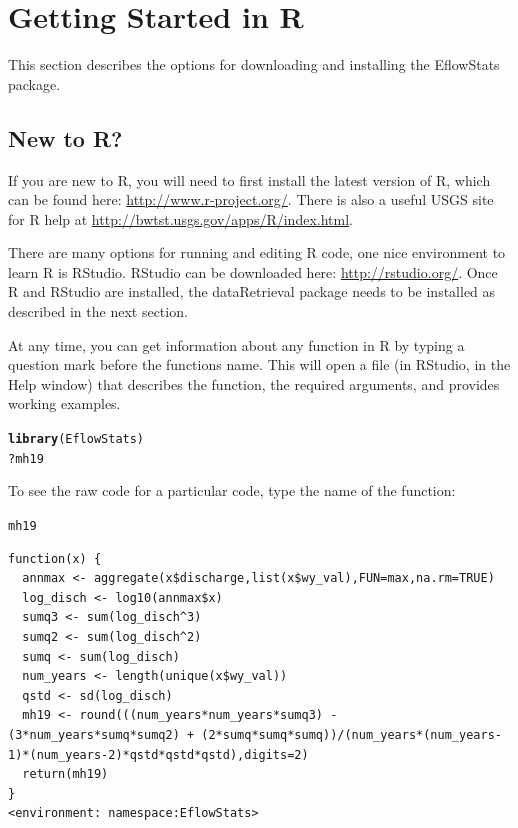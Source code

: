 \documentclass[a4paper,11pt]{article}\usepackage[]{graphicx}\usepackage[]{color}
\makeatletter
\newcommand{\hlopt}[1]{\textcolor[rgb]{0,0,0}{#1}}%
\newcommand{\hlstd}[1]{\textcolor[rgb]{0.345,0.345,0.345}{#1}}%
\newcommand{\hlkwd}[1]{\textcolor[rgb]{0.737,0.353,0.396}{\textbf{#1}}}%
\newenvironment{kframe}{%
 \def\at@end@of@kframe{}%
 \ifinner\ifhmode%
  \def\at@end@of@kframe{\end{minipage}}%
  \begin{minipage}{\columnwidth}%
 \fi\fi%
 \def\FrameCommand##1{\hskip\@totalleftmargin \hskip-\fboxsep
 \colorbox{shadecolor}{##1}\hskip-\fboxsep
     \hskip-\linewidth \hskip-\@totalleftmargin \hskip\columnwidth}%
 \MakeFramed {\advance\hsize-\width
   \@totalleftmargin\z@ \linewidth\hsize
   \@setminipage}}%
 {\par\unskip\endMakeFramed%
 \at@end@of@kframe}
\newenvironment{knitrout}{}{} %
\makeatother
\begin{document}
\FloatBarrier
\clearpage

\section{Getting Started in R}
\label{sec:started}
This section describes the options for downloading and installing the EflowStats package.

\subsection{New to R?}
If you are new to R, you will need to first install the latest version of R, which can be found here: \url{http://www.r-project.org/}. There is also a useful USGS site for R help at \url{http://bwtst.usgs.gov/apps/R/index.html}.

There are many options for running and editing R code, one nice environment to learn R is RStudio. RStudio can be downloaded here: \url{http://rstudio.org/}. Once R and RStudio are installed, the dataRetrieval package needs to be installed as described in the next section.

At any time, you can get information about any function in R by typing a question mark before the functions name.  This will open a file (in RStudio, in the Help window) that describes the function, the required arguments, and provides working examples.

\begin{knitrout}
\color{fgcolor}\begin{kframe}
\begin{alltt}
\hlkwd{library}\hlstd{(EflowStats)}
\hlopt{?}\hlstd{mh19}
\end{alltt}
\end{kframe}
\end{knitrout}

To see the raw code for a particular code, type the name of the function:
\begin{knitrout}
\color{fgcolor}\begin{kframe}
\begin{alltt}
\hlstd{mh19}
\end{alltt}
\begin{verbatim}
function(x) {
  annmax <- aggregate(x$discharge,list(x$wy_val),FUN=max,na.rm=TRUE)
  log_disch <- log10(annmax$x)
  sumq3 <- sum(log_disch^3)
  sumq2 <- sum(log_disch^2)
  sumq <- sum(log_disch)
  num_years <- length(unique(x$wy_val))
  qstd <- sd(log_disch)
  mh19 <- round(((num_years*num_years*sumq3) - (3*num_years*sumq*sumq2) + (2*sumq*sumq*sumq))/(num_years*(num_years-1)*(num_years-2)*qstd*qstd*qstd),digits=2)
  return(mh19)
}
<environment: namespace:EflowStats>
\end{verbatim}
\end{kframe}
\end{knitrout}
\end{document}

